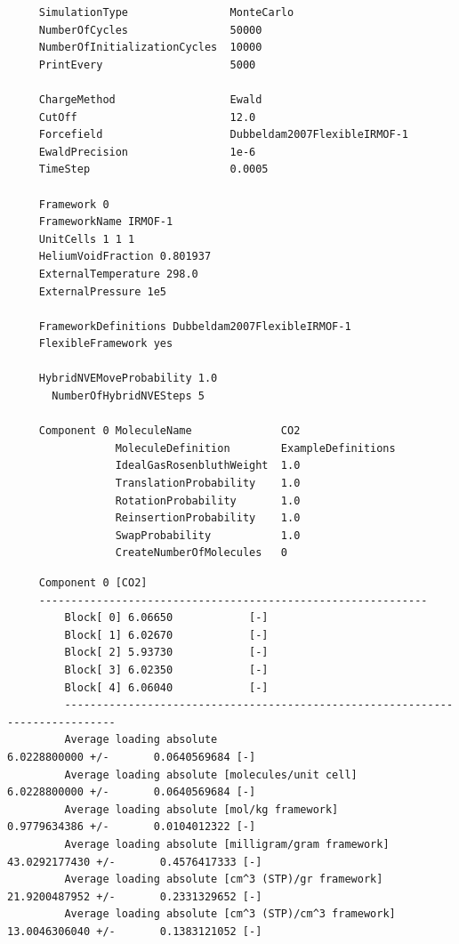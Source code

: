 \begin{tiny}
\begin{verbatim}
     SimulationType                MonteCarlo
     NumberOfCycles                50000
     NumberOfInitializationCycles  10000
     PrintEvery                    5000
     
     ChargeMethod                  Ewald
     CutOff                        12.0
     Forcefield                    Dubbeldam2007FlexibleIRMOF-1
     EwaldPrecision                1e-6
     TimeStep                      0.0005
     
     Framework 0
     FrameworkName IRMOF-1
     UnitCells 1 1 1
     HeliumVoidFraction 0.801937
     ExternalTemperature 298.0
     ExternalPressure 1e5
     
     FrameworkDefinitions Dubbeldam2007FlexibleIRMOF-1
     FlexibleFramework yes
     
     HybridNVEMoveProbability 1.0
       NumberOfHybridNVESteps 5
     
     Component 0 MoleculeName              CO2
                 MoleculeDefinition        ExampleDefinitions
                 IdealGasRosenbluthWeight  1.0
                 TranslationProbability    1.0
                 RotationProbability       1.0
                 ReinsertionProbability    1.0
                 SwapProbability           1.0
                 CreateNumberOfMolecules   0
\end{verbatim}
\end{tiny}

\begin{tiny}
\begin{verbatim}
     Component 0 [CO2]
     -------------------------------------------------------------
         Block[ 0] 6.06650            [-]
         Block[ 1] 6.02670            [-]
         Block[ 2] 5.93730            [-]
         Block[ 3] 6.02350            [-]
         Block[ 4] 6.06040            [-]
         ------------------------------------------------------------------------------
         Average loading absolute                              6.0228800000 +/-       0.0640569684 [-]
         Average loading absolute [molecules/unit cell]        6.0228800000 +/-       0.0640569684 [-]
         Average loading absolute [mol/kg framework]                  0.9779634386 +/-       0.0104012322 [-]
         Average loading absolute [milligram/gram framework]         43.0292177430 +/-       0.4576417333 [-]
         Average loading absolute [cm^3 (STP)/gr framework]          21.9200487952 +/-       0.2331329652 [-]
         Average loading absolute [cm^3 (STP)/cm^3 framework]        13.0046306040 +/-       0.1383121052 [-]
\end{verbatim}
\end{tiny}

